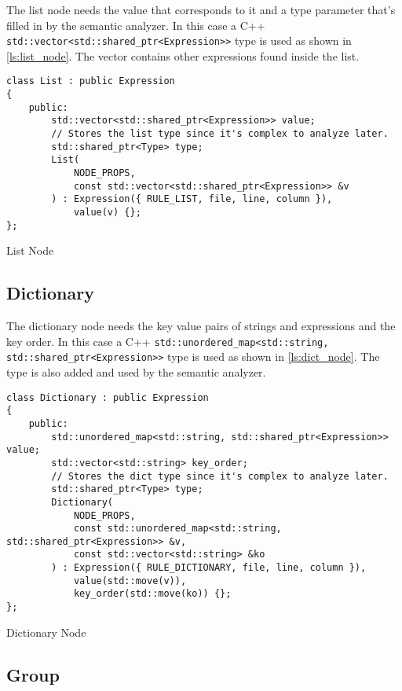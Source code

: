 The list node needs the value that corresponds to it and a type parameter that's filled in by the semantic analyzer.
In this case a C++ \texttt{std::vector<std::shared\_ptr<Expression>>} type is used as shown in \autoref{ls:list_node}.
The vector contains other expressions found inside the list.

\begin{listing}[H]
\begin{verbatim}
class List : public Expression
{
    public:
        std::vector<std::shared_ptr<Expression>> value;
        // Stores the list type since it's complex to analyze later.
        std::shared_ptr<Type> type;
        List(
            NODE_PROPS,
            const std::vector<std::shared_ptr<Expression>> &v
        ) : Expression({ RULE_LIST, file, line, column }),
            value(v) {};
};
\end{verbatim}
\caption{List Node}
\label{ls:list_node}
\end{listing}

\subsection{Dictionary}

The dictionary node needs the key value pairs of strings and expressions and the key order. In this case a C++ \texttt{std::unordered\_map<std::string, std::shared\_ptr<Expression>>} type is used as shown in \autoref{ls:dict_node}. The type is also added and used by the semantic analyzer.

\begin{listing}[H]
\begin{verbatim}
class Dictionary : public Expression
{
    public:
        std::unordered_map<std::string, std::shared_ptr<Expression>> value;
        std::vector<std::string> key_order;
        // Stores the dict type since it's complex to analyze later.
        std::shared_ptr<Type> type;
        Dictionary(
            NODE_PROPS,
            const std::unordered_map<std::string, std::shared_ptr<Expression>> &v,
            const std::vector<std::string> &ko
        ) : Expression({ RULE_DICTIONARY, file, line, column }),
            value(std::move(v)),
            key_order(std::move(ko)) {};
};
\end{verbatim}
\caption{Dictionary Node}
\label{ls:dict_node}
\end{listing}

\subsection{Group}

